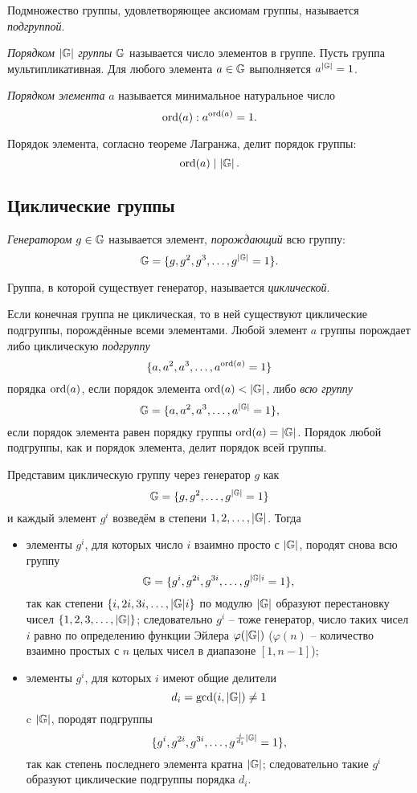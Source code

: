 Подмножество группы, удовлетворяющее аксиомам группы, называется \emph{подгруппой}.

\emph{Порядком} $|\mathbb{G}|$ \emph{группы} $\mathbb{G}$ называется число элементов в группе. Пусть группа мультипликативная. Для любого элемента $a \in \mathbb{G}$ выполняется $a^{|\mathbb{G}|} = 1$.

\emph{Порядком элемента} $a$ называется минимальное натуральное число
    \[ \operatorname{ord}(a): a^{\operatorname{ord}(a)} = 1. \]

 Порядок элемента, согласно теореме Лагранжа, делит порядок группы:
    \[ \operatorname{ord}(a) \mid \left|\mathbb{G}\right|. \]


\subsection{Циклические группы}

\emph{Генератором} $g \in \mathbb{G}$ называется элемент, \emph{порождающий} всю группу:
    \[ \mathbb{G} = \{g, g^2, g^3, \ldots, g^{|\mathbb{G}|} = 1\}. \]

Группа, в которой существует генератор, называется \emph{циклической}.

Если конечная группа не циклическая, то в ней существуют циклические подгруппы, порождённые всеми элементами. Любой элемент $a$ группы порождает либо циклическую \emph{подгруппу}
    \[ \{ a, a^2, a^3, \dots, a^{\operatorname{ord}(a)} = 1 \} \]
порядка $\operatorname{ord}(a)$, если порядок элемента $\operatorname{ord}(a) < |\mathbb{G}|$, либо \emph{всю группу}
    \[ \mathbb{G} = \{ a, a^2, a^3, \dots, a^{|\mathbb{G}|} = 1 \}, \]
если порядок элемента равен порядку группы $\operatorname{ord}(a) = |\mathbb{G}|$. Порядок любой подгруппы, как и порядок элемента, делит порядок всей группы.

Представим циклическую группу через генератор $g$ как
    \[ \mathbb{G} = \{g, g^2, \ldots, g^{|\mathbb{G}|} = 1\} \]
и каждый элемент $g^i$ возведём в степени $1, 2, \ldots, |\mathbb{G}|$. Тогда
\begin{itemize}
    \item элементы $g^i$, для которых число $i$ взаимно просто с $|\mathbb{G}|$, породят снова всю группу
            \[ \mathbb{G} = \{ g^i, g^{2i}, g^{3i}, \dots, g^{|\mathbb{G}| i} = 1 \}, \]
        так как степени $\{i, 2i, 3i, \dots, |\mathbb{G}| i \}$ по модулю $|\mathbb{G}|$ образуют перестановку чисел $\{1, 2, 3, \dots, |\mathbb{G}|\}$; следовательно $g^i$ -- тоже генератор, число таких чисел $i$ равно по определению функции Эйлера $\varphi(|\mathbb{G}|)$ ($\varphi(n)$ -- количество взаимно простых с $n$ целых чисел в диапазоне $[1,n-1]$);
    \item элементы $g^i$, для которых $i$ имеют общие делители
            \[ d_i = \gcd(i, |\mathbb{G}|) \neq 1 \]
        c $|\mathbb{G}|$, породят подгруппы
            \[ \{ g^i, g^{2i}, g^{3i}, \dots, g^{\frac{i}{d_i} |\mathbb{G}|} = 1\}, \]
        так как степень последнего элемента кратна $|\mathbb{G}|$; следовательно такие $g^i$ образуют циклические подгруппы порядка $d_i$.
\end{itemize}

